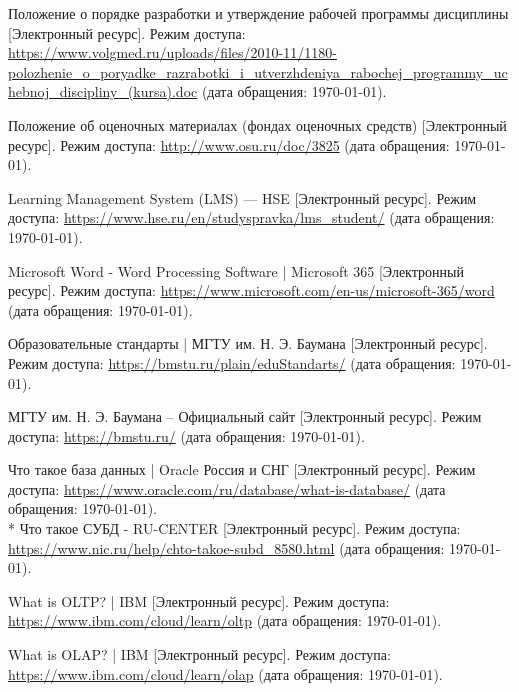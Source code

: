
\begingroup
\renewcommand{\section}[2]{}
\begin{thebibliography}{}
	Положение о порядке разработки и утверждение рабочей программы дисциплины [Электронный ресурс]. Режим доступа: \url{https://www.volgmed.ru/uploads/files/2010-11/1180-polozhenie_o_poryadke_razrabotki_i_utverzhdeniya_rabochej_programmy_uchebnoj_discipliny_(kursa).doc} (дата обращения: \today).
	
	Положение об оценочных материалах (фондах
	оценочных средств) [Электронный ресурс].
	\newblock Режим доступа: \url{http://www.osu.ru/doc/3825} (дата
	обращения: \today).
	
	Learning Management System (LMS) — HSE [Электронный ресурс].
	\newblock Режим доступа:
	\url{https://www.hse.ru/en/studyspravka/lms_student/} (дата
	обращения: \today).
	
	Microsoft Word - Word Processing Software | Microsoft 365
	[Электронный ресурс].
	\newblock Режим доступа:
	\url{https://www.microsoft.com/en-us/microsoft-365/word} (дата
	обращения: \today).
	
	Образовательные стандарты | МГТУ им. Н. Э.
	Баумана [Электронный ресурс].
	\newblock Режим доступа: \url{https://bmstu.ru/plain/eduStandarts/}
	(дата обращения: \today).
	
	МГТУ им. Н. Э. Баумана -- Официальный сайт
	[Электронный ресурс].
	\newblock Режим доступа: \url{https://bmstu.ru/} (дата
	обращения: \today).
	
	Что такое база данных | Oracle Россия и СНГ
	[Электронный ресурс].
	\newblock Режим доступа:
	\url{https://www.oracle.com/ru/database/what-is-database/} (дата
	обращения: \today).
	\\*
	Что такое СУБД - RU-CENTER [Электронный ресурс].
	\newblock Режим доступа:
	\url{https://www.nic.ru/help/chto-takoe-subd_8580.html} (дата
	обращения: \today).
	
	What is OLTP? | IBM [Электронный ресурс].
	\newblock Режим доступа: \url{https://www.ibm.com/cloud/learn/oltp}
	(дата обращения: \today).
	
	What is OLAP? | IBM [Электронный ресурс].
	\newblock Режим доступа: \url{https://www.ibm.com/cloud/learn/olap}
	(дата обращения: \today).
	

\end{thebibliography}
